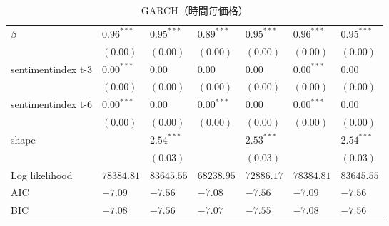 \begin{landscape}
\begin{table}[]
\begin{tabular}{lllllll}
$\beta$            & $0.96^{***}$ & $0.95^{***}$  & $0.89^{***}$ & $0.95^{***}$  & $0.96^{***}$ & $0.95^{***}$  \\
                   & $(0.00)$     & $(0.00)$      & $(0.00)$     & $(0.00)$      & $(0.00)$     & $(0.00)$      \\
sentimentindex t-3 & $0.00^{***}$ & $0.00$        & $0.00$       & $0.00$        & $0.00^{***}$ & $0.00$        \\
                   & $(0.00)$     & $(0.00)$      & $(0.00)$     & $(0.00)$      & $(0.00)$     & $(0.00)$      \\
sentimentindex t-6 & $0.00^{***}$ & $0.00$        & $0.00^{***}$ & $0.00$        & $0.00^{***}$ & $0.00$        \\
                   & $(0.00)$     & $(0.00)$      & $(0.00)$     & $(0.00)$      & $(0.00)$     & $(0.00)$      \\
shape              &              & $2.54^{***}$  &              & $2.53^{***}$  &              & $2.54^{***}$  \\
                   &              & $(0.03)$      &              & $(0.03)$      &              & $(0.03)$      \\ \hline
Log likelihood     & $78384.81$   & $83645.55$    & $68238.95$   & $72886.17$    & $78384.81$   & $83645.55$    \\
AIC                & $-7.09$      & $-7.56$       & $-7.08$      & $-7.56$       & $-7.09$      & $-7.56$       \\
BIC                & $-7.08$      & $-7.56$       & $-7.07$      & $-7.55$       & $-7.08$      & $-7.56$       \\ \hline
\end{tabular}
\caption{GARCH（時間毎価格）}
\end{table}
\end{landscape}






